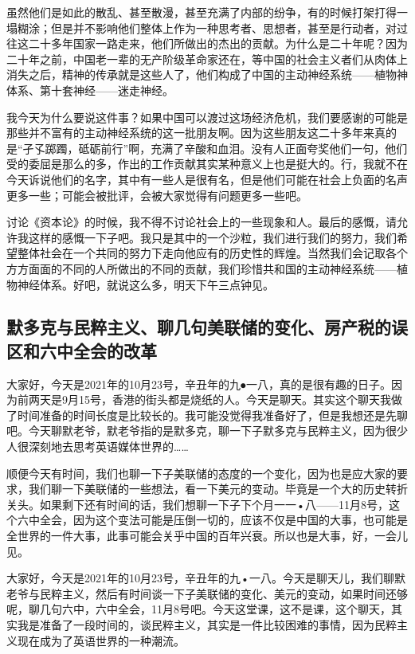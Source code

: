 \documentclass[UTF8, 12pt, a4paper]{ctexrep}
\begin{document}
虽然他们是如此的散乱、甚至散漫，甚至充满了内部的纷争，有的时候打架打得一塌糊涂；但是并不影响他们整体上作为一种思考者、思想者，甚至是行动者，对过往这二十多年国家一路走来，他们所做出的杰出的贡献。为什么是二十年呢？因为二十年之前，中国老一辈的无产阶级革命家还在，等中国的社会主义者们从肉体上消失之后，精神的传承就是这些人了，他们构成了中国的主动神经系统——植物神体系、第十套神经——迷走神经。

我今天为什么要说这件事？如果中国可以渡过这场经济危机，我们要感谢的可能是那些并不富有的主动神经系统的这一批朋友啊。因为这些朋友这二十多年来真的是“孑孓踯躅，砥砺前行”啊，充满了辛酸和血泪。没有人正面夸奖他们一句，他们受的委屈是那么的多，作出的工作贡献其实某种意义上也是挺大的。行，我就不在今天诉说他们的名字，其中有一些人是很有名，但是他们可能在社会上负面的名声更多一些；可能会被批评，会被大家觉得有问题更多一些吧。

讨论《资本论》的时候，我不得不讨论社会上的一些现象和人。最后的感慨，请允许我这样的感慨一下子吧。我只是其中的一个沙粒，我们进行我们的努力，我们希望整体社会在一个共同的努力下走向他应有的历史性的辉煌。当然我们会记取各个方方面面的不同的人所做出的不同的贡献，我们珍惜共和国的主动神经系统——植物神经体系。好吧，就说这么多，明天下午三点钟见。

\subsection{默多克与民粹主义、聊几句美联储的变化、房产税的误区和六中全会的改革}

大家好，今天是2021年的10月23号，辛丑年的九⦁一八，真的是很有趣的日子。因为前两天是9月15号，香港的街头都是烧纸的人。今天是聊天。其实这个聊天我做了时间准备的时间长度是比较长的。我可能没觉得我准备好了，但是我想还是先聊吧。今天聊默老爷，默老爷指的是默多克，聊一下子默多克与民粹主义，因为很少人很深刻地去思考英语媒体世界的……

顺便今天有时间，我们也聊一下子美联储的态度的一个变化，因为也是应大家的要求，我们聊一下美联储的一些想法，看一下美元的变动。毕竟是一个大的历史转折关头。如果剩下还有时间的话，我们想聊一下子下个月一一•八——11月8号，这个六中全会，因为这个变法可能是压倒一切的，应该不仅是中国的大事，也可能是全世界的一件大事，此事可能会关乎中国的百年兴衰。所以也是大事，好，一会儿见。

大家好，今天是2021年的10月23号，辛丑年的九•一八。今天是聊天儿，我们聊默老爷与民粹主义，然后有时间谈一下子美联储的变化、美元的变动，如果时间还够呢，聊几句六中，六中全会，11月8号吧。今天这堂课，这不是课，这个聊天，其实我是准备了一段时间的，谈民粹主义，其实是一件比较困难的事情，因为民粹主义现在成为了英语世界的一种潮流。
\end{document}
